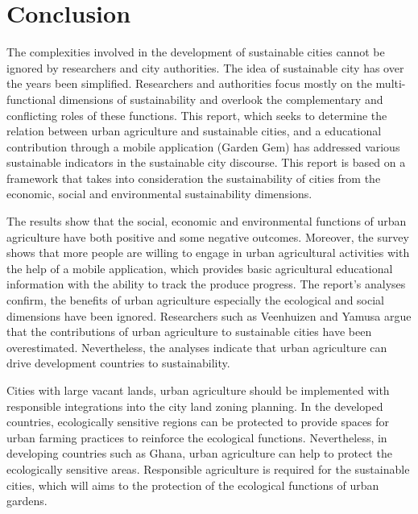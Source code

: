 \chapter{Conclusion} %

\label{Chapter:Conclusion}

The complexities involved in the development of sustainable cities cannot be ignored by researchers and city authorities. The idea of sustainable city has over the years been simplified. Researchers and authorities focus mostly on the multi-functional dimensions of sustainability and overlook the complementary and conflicting roles of these functions. This report, which seeks to determine the relation between urban agriculture and sustainable cities, and a educational contribution through a mobile application (Garden Gem) has addressed various sustainable indicators in the sustainable city discourse. This report is based on a framework that takes into consideration the sustainability of cities from the economic, social and environmental sustainability dimensions.

The results show that the social, economic and environmental functions of urban agriculture have both positive and some negative outcomes. Moreover, the survey shows that more people are willing to engage in urban agricultural activities with the help of a mobile application, which provides basic agricultural educational information with the ability to track the produce progress. The report's analyses confirm, the benefits of urban agriculture especially the ecological and social dimensions have been ignored. Researchers such as Veenhuizen \cite{Veenhuizen} and Yamusa \cite{Agbenyour2014} argue that the contributions of urban agriculture to sustainable cities have been overestimated. Nevertheless, the analyses indicate that urban agriculture can drive development countries to sustainability.

Cities with large vacant lands, urban agriculture should be implemented with responsible integrations into the city land zoning planning. In the developed countries, ecologically sensitive regions can be protected to provide spaces for urban farming practices to reinforce the ecological functions. Nevertheless, in developing countries such as Ghana, urban agriculture can help to protect the ecologically sensitive areas. Responsible agriculture is required for the sustainable cities, which will aims to the protection of the ecological functions of urban gardens.

